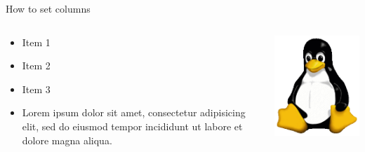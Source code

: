 \begin{frame}{How to set columns}
  \begin{columns}[T]
    \begin{column}{.45\textwidth}
      \begin{itemize}
        \item Item 1
        \item Item 2
        \item Item 3
        \item Lorem ipsum dolor sit amet, consectetur adipisicing elit, sed do eiusmod tempor incididunt ut labore et dolore magna aliqua.
      \end{itemize}
    \end{column}
    \begin{column}{.45\textwidth}
      \includegraphics[width=.9\textwidth]{pictures/Tux}
    \end{column}
  \end{columns}
\end{frame}


